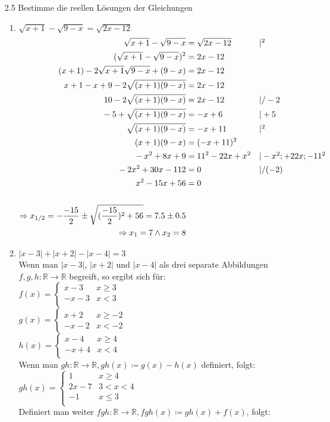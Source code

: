 \documentclass[12pt,letterpaper]{article}
\newcommand{\alignleft}[1]{\tag*{\llap{\makebox[\linewidth][l]{$#1$}}}}
\newcommand{\LLeftrightarrow}{ \alignleft{\Leftrightarrow}}
\newcommand{\eqinfo}[1]{&\makebox[2cm][l]{$\vert #1$}}
\newcommand{\Eqn}[3]{#1 &#2 #3}
\newcommand{\eqn}[2]{\LLeftrightarrow\Eqn{#1}{=}{#2}\\}
\newcommand{\eqni}[3]{\LLeftrightarrow\Eqn{#1}{=}{#2}\eqinfo{#3}\\}
\newcommand{\eqnfi}[3]{\Eqn{#1}{=}{#2}\eqinfo{#3}\\}
\begin{document}
\begin{enumerate}
\item [2.5] Bestimme die reellen Lösungen der Gleichungen
\begin{enumerate}
\item $\sqrt{x+1}-\sqrt{9-x}=\sqrt{2x-12}$\\
\begin{align*}
\eqnfi{\sqrt{x+1}-\sqrt{9-x}}{\sqrt{2x-12}}{^2}
\eqn{(\sqrt{x+1}-\sqrt{9-x})^2}{2x-12}
\eqn{(x+1)-2\sqrt{x+1}\sqrt{9-x}+(9-x)}{2x-12}
\eqn{x+1-x+9-2\sqrt{(x+1)(9-x)}}{2x-12}
\eqni{10-2\sqrt{(x+1)(9-x)}}{2x-12}{/-2}
\eqni{-5+\sqrt{(x+1)(9-x)}}{-x+6}{+5}
\eqni{\sqrt{(x+1)(9-x)}}{-x+11}{^2}
\eqn{(x+1)(9-x)}{(-x+11)^2}
\eqni{-x^2+8x+9}{11^2-22x+x^2}{-x^2; +22x; -11^2}
\eqni{-2x^2+30x-112}{0}{/(-2)}
\eqn{x^2-15x+56}{0}
\\
\Rightarrow x_{1/2} = -\frac{-15}{2}\pm\sqrt{(\frac{-15}{2})^2+56}
= 7.5\pm 0.5\\
\Rightarrow x_1=7 \land x_2=8
\end{align*}
\item $|x-3|+|x+2|-|x-4|=3$\\
Wenn man $|x-3|$, $|x+2|$ und $|x-4|$ als drei separate Abbildungen $f,g,h:\mathbb{R}\to\mathbb{R}$ begreift, so ergibt sich für:\\
$f(x) = \begin{cases}
x-3 &x\geq 3\\
-x-3 &x<3\\
\end{cases}$\\
$g(x) = \begin{cases}
x+2 &x\geq -2\\
-x-2 &x<-2
\end{cases}$\\
$h(x) = \begin{cases}
x-4 &x\geq 4\\
-x+4 &x<4\\
\end{cases}$\\
Wenn man $gh:\mathbb{R}\to\mathbb{R}, gh(x)\coloneqq g(x)-h(x)$ definiert, folgt:\\
$gh(x) = \begin{cases}
1 &x\geq 4\\
2x-7 &3<x<4\\
-1 &x\leq3\\
\end{cases}$\\
\newpage
Definiert man weiter $fgh:\mathbb{R}\to\mathbb{R}, fgh(x)\coloneqq gh(x)+f(x)$, folgt:\\

\end{enumerate}
\end{enumerate}
\end{document}
